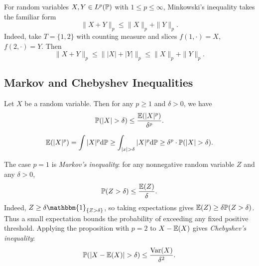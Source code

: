 \begin{remarkbox}
    For random variables $X,Y\in L^p(\mathbb{P})$ with $1\leq p\leq\infty$,
    Minkowski's inequality takes the familiar form
    $$\|X+Y\|_p\leq\|X\|_p+\|Y\|_p.$$
    Indeed, take $T=\{1,2\}$ with counting
    measure and slices $f(1,\cdot)=X$, $f(2,\cdot)=Y$. Then
    $$\|X+Y\|_p
    \leq\bigl\||X|+|Y|\bigr\|_p
    \leq\|X\|_p+\|Y\|_p.$$
\end{remarkbox}

\subsection{Markov and Chebyshev Inequalities}

\begin{propositionbox}
    Let $X$ be a random variable.
    Then for any $p \ge 1$ and $\delta > 0$, we have
    $$\mathbb{P}(|X| > \delta) \le \frac{\mathbb{E}(|X|^p)}{\delta^p}.$$
\end{propositionbox}
\begin{proofbox}
    $$\mathbb{E}(|X|^p) = \int |X|^p \mathrm{d} \mathbb{P} \ge \int_{|x| > \delta} |X|^p \mathrm{d} \mathbb{P} \ge \delta^p \cdot \mathbb{P}(|X| > \delta).$$
\end{proofbox}
\begin{remarkbox}
    The case $p=1$ is \emph{Markov's inequality}: for any
    nonnegative random variable $Z$ and any $\delta>0$,
    \begin{equation}\label{eq:markov}
        \mathbb{P}(Z>\delta)\leq\frac{\mathbb{E}(Z)}{\delta}.
    \end{equation}
    Indeed, $Z\geq\delta\mathbbm{1}_{\{Z>\delta\}}$, so taking
    expectations gives $\mathbb{E}(Z)\geq\delta\mathbb{P}(Z>\delta)$.
    Thus a small expectation bounds the probability of exceeding
    any fixed positive threshold.
    Applying the proposition with $p=2$ to $X-\mathbb{E}(X)$ gives
    \emph{Chebyshev's inequality}:
    \begin{equation}\label{eq:chebyshev}
        \PP(|X-\EE(X)|>\delta)\leq\frac{\Var(X)}{\delta^2}.
    \end{equation}
\end{remarkbox}
